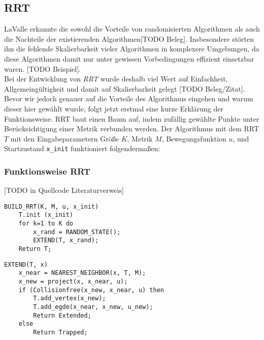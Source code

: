 \subsection{RRT}
LaValle erkannte die sowohl die Vorteile von randomisierten Algorithmen als auch die Nachteile der existierenden Algorithmen[TODO Beleg]. Insbesondere störten ihn die fehlende Skalierbarkeit vieler Algorithmen in komplexere Umgebungen, da diese Algorithmen damit nur unter gewissen Vorbedingungen effizient einsetzbar waren. [TODO Beispiel].\\
Bei der Entwicklung von \textit{RRT} wurde deshalb viel Wert auf Einfachheit, Allgemeingültigkeit und damit auf Skalierbarkeit gelegt [TODO Beleg/Zitat]. Bevor wir jedoch genauer auf die Vorteile des Algorithmus eingehen und warum dieser hier gewählt wurde, folgt jetzt erstmal eine kurze Erklärung der Funktionsweise. RRT baut einen Baum auf, indem zufällig gewählte Punkte unter Berücksichtigung einer Metrik verbunden werden. Der Algorithmus mit dem RRT $T$ mit den Eingabeparametern Größe $K$, Metrik $M$, Bewegungsfunktion $u$, und Startzustand \verb|x_init|  funktioniert folgendermaßen:

\subsubsection{Funktionsweise RRT}
[TODO in Quellcode Literaturverweis]
\lstset{language=Pascal, stepnumber=1, numbers=left}
\begin{lstlisting}
BUILD_RRT(K, M, u, x_init)
	T.init (x_init)
	for k=1 to K do
		x_rand = RANDOM_STATE();
		EXTEND(T, x_rand);
	Return T;
\end{lstlisting}
\begin{lstlisting}
EXTEND(T, x)
	x_near = NEAREST_NEIGHBOR(x, T, M);
	x_new = project(x, x_near, u);
	if (Collisionfree(x_new, x_near, u) then
		T.add_vertex(x_new);
		T.add_egde(x_near, x_new, u_new);
		Return Extended;
	else
		Return Trapped;
\end{lstlisting}

